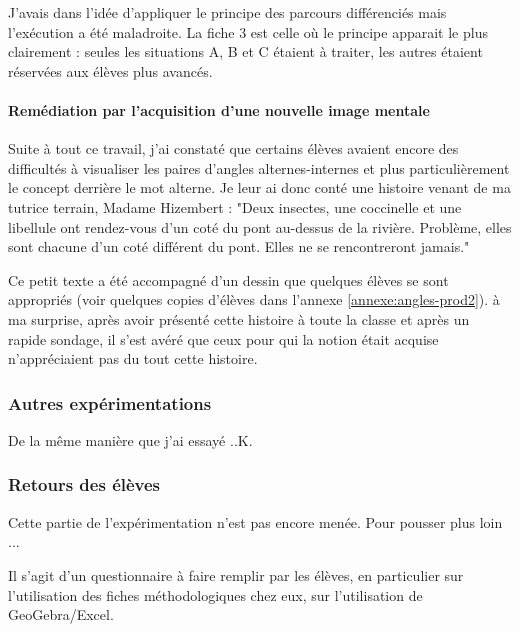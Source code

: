 J'avais dans l'idée d'appliquer le principe des parcours différenciés mais l'exécution a été maladroite. La fiche 3 est celle où le principe apparait le plus clairement : seules les situations A, B et C étaient à traiter, les autres étaient réservées aux élèves plus avancés.

\paragraph{Remédiation par l'acquisition d'une nouvelle image mentale}

Suite à tout ce travail, j'ai constaté que certains élèves avaient encore des difficultés à visualiser les paires d'angles alternes-internes et plus particulièrement le concept derrière le mot alterne. Je leur ai donc conté une histoire venant de ma tutrice terrain, Madame Hizembert : "Deux insectes, une coccinelle et une libellule ont rendez-vous d'un coté du pont au-dessus de la rivière. Problème, elles sont chacune d'un coté différent du pont. Elles ne se rencontreront jamais."

Ce petit texte a été accompagné d'un dessin que quelques élèves se sont appropriés (voir quelques copies d'élèves dans l'annexe \ref{annexe:angles-prod2}). à ma surprise, après avoir présenté cette histoire à toute la classe et après un rapide sondage, il s'est avéré que ceux pour qui la notion était acquise n'appréciaient pas du tout cette histoire.

\subsubsection{Autres expérimentations}

De la même manière que j'ai essayé ..K.

\subsubsection{Retours des élèves}

Cette partie de l'expérimentation n'est pas encore menée. Pour pousser plus loin ...

Il s'agit d'un questionnaire à faire remplir par les élèves, en particulier sur l'utilisation des fiches méthodologiques chez eux, sur l'utilisation de GeoGebra/Excel.

